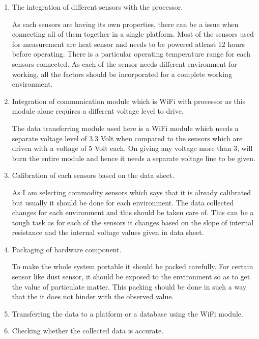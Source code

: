 \documentclass[11pt]{article}
\begin{document}
\begin{enumerate}


\item The integration of different sensors with the processor.
\par
As each sensors are having its own properties, there can be a issue when connecting all of them together in a single platform. Most of the sensors used for measurement are heat sensor and needs to be powered atleast 12 hours before operating. There is a particular operating temperature range for each sensors connected. As each of the sensor needs different environment for working, all the factors should be incorporated for a complete working environment.

\item Integration of communication module which is  WiFi with processor as this module alone requires a different voltage level to drive.
\par
The data transferring module used here is a WiFi module which needs a separate voltage level of 3.3 Volt when compared to the sensors which are driven with a voltage of 5 Volt each. On giving any voltage more than 3, will burn the entire module and hence it needs a separate voltage line to be given. 

\item Calibration of each sensors based on the data sheet.
\par
As I am selecting commodity sensors which says that it is already calibrated but usually it should be done for each environment. The data collected changes for each environment and this should be taken care of. This can be a tough task as for each of the sensors it changes based on the slope of internal resistance and the internal voltage values given in data sheet. 
\item Packaging of hardware component.
\par
To make the whole system portable it should be packed carefully. For certain sensor like dust sensor, it should be exposed to the environment so as to get the value of particulate matter. This packing should be done in such a way that the it does not hinder with the observed value.

\item Transferring the data to a platform or a database using the WiFi module.

\item Checking whether the collected data is accurate.


\end{enumerate}
\newpage
 
\end{document}

